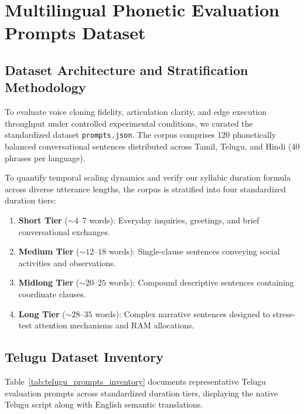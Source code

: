 \chapter{Multilingual Phonetic Evaluation Prompts Dataset}
\label{AppendixB}

\section{Dataset Architecture and Stratification Methodology}
To evaluate voice cloning fidelity, articulation clarity, and edge execution throughput under controlled experimental conditions, we curated the standardized dataset \texttt{prompts.json}. The corpus comprises 120 phonetically balanced conversational sentences distributed across Tamil, Telugu, and Hindi (40 phrases per language).

To quantify temporal scaling dynamics and verify our syllabic duration formula across diverse utterance lengths, the corpus is stratified into four standardized duration tiers:
\begin{enumerate}
    \item \textbf{Short Tier} ($\sim 4\text{--}7$ words): Everyday inquiries, greetings, and brief conversational exchanges.
    \item \textbf{Medium Tier} ($\sim 12\text{--}18$ words): Single-clause sentences conveying social activities and observations.
    \item \textbf{Midlong Tier} ($\sim 20\text{--}25$ words): Compound descriptive sentences containing coordinate clauses.
    \item \textbf{Long Tier} ($\sim 28\text{--}35$ words): Complex narrative sentences designed to stress-test attention mechanisms and RAM allocations.
\end{enumerate}

\clearpage
\section{Telugu Dataset Inventory}
Table~\ref{tab:telugu_prompts_inventory} documents representative Telugu evaluation prompts across standardized duration tiers, displaying the native Telugu script along with English semantic translations.

